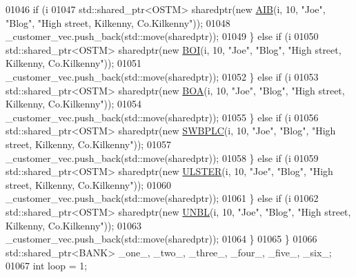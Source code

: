 \begin{DoxyCode}
01046         \textcolor{keywordflow}{if} (i %
01047             std::shared\_ptr<OSTM> sharedptr(\textcolor{keyword}{new} \hyperlink{class_a_i_b}{AIB}(i, 10, \textcolor{stringliteral}{"Joe"}, \textcolor{stringliteral}{"Blog"}, \textcolor{stringliteral}{"High street, Kilkenny,
       Co.Kilkenny"}));
01048             \_customer\_vec.push\_back(std::move(sharedptr));
01049         \} \textcolor{keywordflow}{else} \textcolor{keywordflow}{if} (i %
01050             std::shared\_ptr<OSTM> sharedptr(\textcolor{keyword}{new} \hyperlink{class_b_o_i}{BOI}(i, 10, \textcolor{stringliteral}{"Joe"}, \textcolor{stringliteral}{"Blog"}, \textcolor{stringliteral}{"High street, Kilkenny,
       Co.Kilkenny"}));
01051             \_customer\_vec.push\_back(std::move(sharedptr));
01052         \} \textcolor{keywordflow}{else} \textcolor{keywordflow}{if} (i %
01053             std::shared\_ptr<OSTM> sharedptr(\textcolor{keyword}{new} \hyperlink{class_b_o_a}{BOA}(i, 10, \textcolor{stringliteral}{"Joe"}, \textcolor{stringliteral}{"Blog"}, \textcolor{stringliteral}{"High street, Kilkenny,
       Co.Kilkenny"}));
01054             \_customer\_vec.push\_back(std::move(sharedptr));
01055         \} \textcolor{keywordflow}{else} \textcolor{keywordflow}{if} (i %
01056             std::shared\_ptr<OSTM> sharedptr(\textcolor{keyword}{new} \hyperlink{class_s_w_b_p_l_c}{SWBPLC}(i, 10, \textcolor{stringliteral}{"Joe"}, \textcolor{stringliteral}{"Blog"}, \textcolor{stringliteral}{"High street, Kilkenny,
       Co.Kilkenny"}));
01057             \_customer\_vec.push\_back(std::move(sharedptr));
01058         \} \textcolor{keywordflow}{else} \textcolor{keywordflow}{if} (i %
01059             std::shared\_ptr<OSTM> sharedptr(\textcolor{keyword}{new} \hyperlink{class_u_l_s_t_e_r}{ULSTER}(i, 10, \textcolor{stringliteral}{"Joe"}, \textcolor{stringliteral}{"Blog"}, \textcolor{stringliteral}{"High street, Kilkenny,
       Co.Kilkenny"}));
01060             \_customer\_vec.push\_back(std::move(sharedptr));
01061         \} \textcolor{keywordflow}{else} \textcolor{keywordflow}{if} (i %
01062             std::shared\_ptr<OSTM> sharedptr(\textcolor{keyword}{new} \hyperlink{class_u_n_b_l}{UNBL}(i, 10, \textcolor{stringliteral}{"Joe"}, \textcolor{stringliteral}{"Blog"}, \textcolor{stringliteral}{"High street, Kilkenny,
       Co.Kilkenny"}));
01063             \_customer\_vec.push\_back(std::move(sharedptr));
01064         \}
01065     \}
01066     std::shared\_ptr<BANK> \_one\_, \_two\_, \_three\_, \_four\_, \_five\_, \_six\_;
01067     \textcolor{keywordtype}{int} loop = 1;

\end{DoxyCode}
